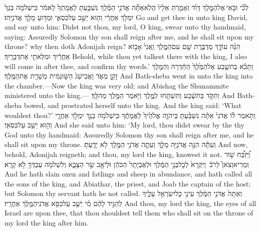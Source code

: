 {לְכִ֞י וּבֹ֣אִי \legarmeh  אֶל\maqqaf הַמֶּ֣לֶךְ דָּוִ֗ד וְאָמַ֤רְתְּ אֵלָיו֙ הֲלֹֽא\maqqaf אַתָּ֞ה אֲדֹנִ֣י הַמֶּ֗לֶךְ נִשְׁבַּ֤עְתָּ לַאֲמָֽתְךָ֙ לֵאמֹ֔ר כִּֽי\maqqaf שְׁלֹמֹ֤ה בְנֵךְ֙ יִמְלֹ֣ךְ אַחֲרַ֔י וְה֖וּא יֵשֵׁ֣ב עַל\maqqaf כִּסְאִ֑י וּמַדּ֖וּעַ מָלַ֥ךְ אֲדֹנִיָּֽהוּ׃}
{Go and get thee in unto king David, and say unto him: Didst not thou, my lord, O king, swear unto thy handmaid, saying: Assuredly Solomon thy son shall reign after me, and he shall sit upon my throne? why then doth Adonijah reign?}
{הִנֵּ֗ה עוֹדָ֛ךְ מְדַבֶּ֥רֶת שָׁ֖ם עִם\maqqaf הַמֶּ֑לֶךְ וַֽאֲנִי֙ אָב֣וֹא אַחֲרַ֔יִךְ וּמִלֵּאתִ֖י אֶת\maqqaf דְּבָרָֽיִךְ׃}
{Behold, while thou yet talkest there with the king, I also will come in after thee, and confirm thy words.’}
{וַתָּבֹ֨א בַת\maqqaf שֶׁ֤בַע אֶל\maqqaf הַמֶּ֙לֶךְ֙ הַחַ֔דְרָה וְהַמֶּ֖לֶךְ זָקֵ֣ן מְאֹ֑ד וַאֲבִישַׁג֙ הַשּׁ֣וּנַמִּ֔ית מְשָׁרַ֖ת אֶת\maqqaf הַמֶּֽלֶךְ׃}
{And Bath-sheba went in unto the king into the chamber.—Now the king was very old; and Abishag the Shunammite ministered unto the king.—}
{וַתִּקֹּ֣ד בַּת\maqqaf שֶׁ֔בַע וַתִּשְׁתַּ֖חוּ לַמֶּ֑לֶךְ וַיֹּ֥אמֶר הַמֶּ֖לֶךְ מַה\maqqaf לָּֽךְ׃}
{And Bath-sheba bowed, and prostrated herself unto the king. And the king said: ‘What wouldest thou?’}
{וַתֹּ֣אמֶר ל֗וֹ אֲדֹנִי֙ אַתָּ֨ה נִשְׁבַּ֜עְתָּ בַּיהֹוָ֤ה אֱלֹהֶ֙יךָ֙ לַאֲמָתֶ֔ךָ כִּֽי\maqqaf שְׁלֹמֹ֥ה בְנֵ֖ךְ יִמְלֹ֣ךְ אַחֲרָ֑י וְה֖וּא יֵשֵׁ֥ב עַל\maqqaf כִּסְאִֽי׃}
{And she said unto him: ‘My lord, thou didst swear by the \lord\space thy God unto thy handmaid: Assuredly Solomon thy son shall reign after me, and he shall sit upon my throne.}
{וְעַתָּ֕ה הִנֵּ֥ה אֲדֹנִיָּ֖ה מָלָ֑ךְ וְעַתָּ֛ה אֲדֹנִ֥י הַמֶּ֖לֶךְ לֹ֥א יָדָֽעְתָּ׃}
{And now, behold, Adonijah reigneth; and thou, my lord the king, knowest it not.}
{וַ֠יִּזְבַּ֠ח שׁ֥וֹר וּֽמְרִיא\maqqaf וְצֹאן֮ לָרֹב֒ \petucha  וַיִּקְרָא֙ לְכׇל\maqqaf בְּנֵ֣י הַמֶּ֔לֶךְ וּלְאֶבְיָתָר֙ הַכֹּהֵ֔ן וּלְיֹאָ֖ב שַׂ֣ר הַצָּבָ֑א וְלִשְׁלֹמֹ֥ה עַבְדְּךָ֖ לֹ֥א קָרָֽא׃}
{And he hath slain oxen and fatlings and sheep in abundance, and hath called all the sons of the king, and Abiathar, the priest, and Joab the captain of the host; but Solomon thy servant hath he not called.}
{וְאַתָּה֙ אֲדֹנִ֣י הַמֶּ֔לֶךְ עֵינֵ֥י כׇל\maqqaf יִשְׂרָאֵ֖ל עָלֶ֑יךָ לְהַגִּ֣יד לָהֶ֔ם מִ֗י יֵשֵׁ֛ב עַל\maqqaf כִּסֵּ֥א אֲדֹנִֽי\maqqaf הַמֶּ֖לֶךְ אַחֲרָֽיו׃}
{And thou, my lord the king, the eyes of all Israel are upon thee, that thou shouldest tell them who shall sit on the throne of my lord the king after him.}
